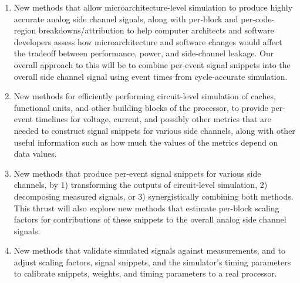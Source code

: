 \documentclass[11 pt]{article}
\begin{document}
\begin{enumerate}[topsep=0pt,itemsep=0pt]
\item New methods that allow microarchitecture-level simulation to produce highly accurate analog side channel signals, along with per-block and per-code-region breakdowns/attribution to help computer architects and software developers assess how microarchitecture and software changes would affect the tradeoff between performance, power, and side-channel leakage. Our overall approach to this will be to combine per-event signal snippets into the overall side channel signal using event times from cycle-accurate simulation.
\item New methods for efficiently performing circuit-level simulation of caches, functional units, and other building blocks of the processor, to provide per-event timelines for voltage, current, and possibly other metrics that are needed to construct signal snippets for various side channels, along with other useful information such as how much the values of the metrics depend on data values.
\item New methods that produce per-event signal snippets for various side channels, by 1) transforming the outputs of circuit-level simulation, 2) decomposing measured signals, or 3) synergistically combining both methods. This thrust will also explore new methods that estimate per-block scaling factors for contributions of these snippets to the overall analog side channel signals.
\item New methods that validate simulated signals against measurements, and to adjust scaling factors, signal snippets, and the simulator's timing parameters to calibrate snippets, weights, and timing parameters to a real processor.
\end{enumerate}

\end{document}
